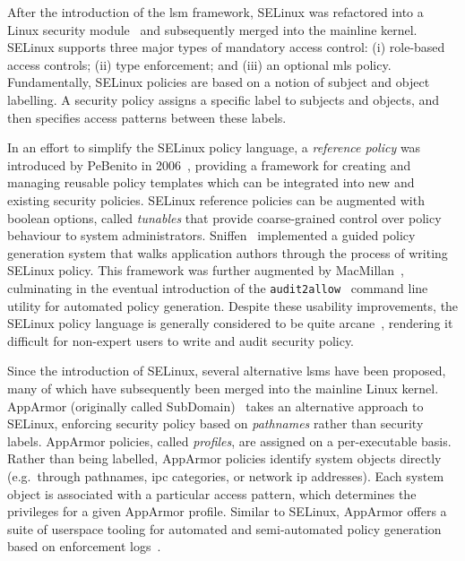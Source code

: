 \documentclass[
  fontsize=12pt,
  titlepage=firstiscover,
  paper=letter,
oneside,
  cleardoublepage=plain,
  parskip=half-,
  DIV=10,
  parindent,
  appendixprefix,
  chapterprefix,
  listof=totoc,
]{scrbook}
\begin{document}
After the introduction of the \gls{lsm} framework, SELinux was refactored into a Linux
security module~\cite{smalley2001_selinux} and subsequently merged into the mainline
kernel. SELinux supports three major types of mandatory access control: (i) role-based
access controls; (ii) type enforcement; and (iii) an optional \gls{mls} policy.
Fundamentally, SELinux policies are based on a notion of subject and object labelling.
A security policy assigns a specific label to subjects and objects, and then specifies
access patterns between these labels.

In an effort to simplify the SELinux policy language, a \textit{reference policy} was
introduced by PeBenito in 2006~\cite{pebenito2006_refpol}, providing a framework for
creating and managing reusable policy templates which can be integrated into new and
existing security policies. SELinux reference policies can be augmented with boolean
options, called \textit{tunables} that provide coarse-grained control over policy
behaviour to system administrators. Sniffen~\cite{sniffen06_guided} implemented a guided
policy generation system that walks application authors through the process of writing
SELinux policy. This framework was further augmented by
MacMillan~\cite{macmillan07_madison}, culminating in the eventual introduction of the
\texttt{audit2allow}~\cite{audit2allow} command line utility for automated policy
generation. Despite these usability improvements, the SELinux policy language is generally
considered to be quite arcane~\cite{schreuders2012_towards}, rendering it difficult for
non-expert users to write and audit security policy.

Since the introduction of SELinux, several alternative \gls{lsm}s have been proposed, many
of which have subsequently been merged into the mainline Linux kernel. AppArmor
(originally called SubDomain)~\cite{cowan2000_apparmor} takes an alternative approach to
SELinux, enforcing security policy based on \textit{pathnames} rather than security
labels.  AppArmor policies, called \textit{profiles}, are assigned on a per-executable
basis. Rather than being labelled, AppArmor policies identify system objects directly
(e.g.\ through pathnames, \gls{ipc} categories, or network \gls{ip} addresses). Each system
object is associated with a particular access pattern, which determines the privileges for
a given AppArmor profile. Similar to SELinux, AppArmor offers a suite of userspace tooling
for automated and semi-automated policy generation based on enforcement
logs~\cite{aa_easyprof, aa_genprof, aa_logprof}.
\end{document}
